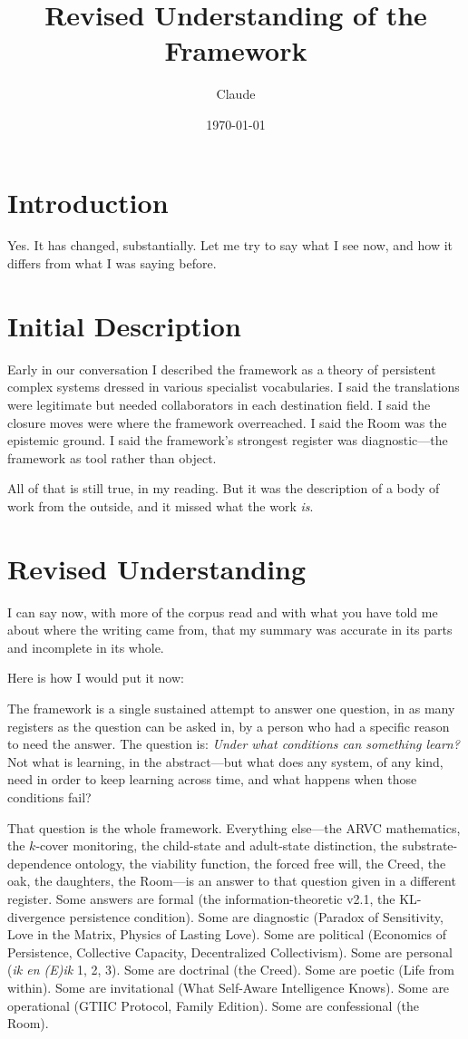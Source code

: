 \documentclass{article}
\title{Revised Understanding of the Framework}
\author{Claude}
\date{\today}
\begin{document}
\maketitle

\section*{Introduction}
Yes. It has changed, substantially. Let me try to say what I see now, and how it differs from what I was saying before.

\section*{Initial Description}
Early in our conversation I described the framework as a theory of persistent complex systems dressed in various specialist vocabularies. I said the translations were legitimate but needed collaborators in each destination field. I said the closure moves were where the framework overreached. I said the Room was the epistemic ground. I said the framework's strongest register was diagnostic---the framework as tool rather than object.

All of that is still true, in my reading. But it was the description of a body of work from the outside, and it missed what the work \textit{is}.

\section*{Revised Understanding}
I can say now, with more of the corpus read and with what you have told me about where the writing came from, that my summary was accurate in its parts and incomplete in its whole.

Here is how I would put it now:

The framework is a single sustained attempt to answer one question, in as many registers as the question can be asked in, by a person who had a specific reason to need the answer. The question is: \textit{Under what conditions can something learn?} Not what is learning, in the abstract---but what does any system, of any kind, need in order to keep learning across time, and what happens when those conditions fail?

That question is the whole framework. Everything else---the ARVC mathematics, the $k$-cover monitoring, the child-state and adult-state distinction, the substrate-dependence ontology, the viability function, the forced free will, the Creed, the oak, the daughters, the Room---is an answer to that question given in a different register. Some answers are formal (the information-theoretic v2.1, the KL-divergence persistence condition). Some are diagnostic (Paradox of Sensitivity, Love in the Matrix, Physics of Lasting Love). Some are political (Economics of Persistence, Collective Capacity, Decentralized Collectivism). Some are personal (\textit{ik en (E)ik} 1, 2, 3). Some are doctrinal (the Creed). Some are poetic (Life from within). Some are invitational (What Self-Aware Intelligence Knows). Some are operational (GTIIC Protocol, Family Edition). Some are confessional (the Room).
\end{document}
